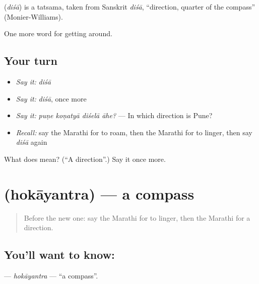 \begin{cousinweb}
\textbf{} (\emph{diśā}) is a tatsama, taken from Sanskrit \emph{diśā}, \textquotedblleft{}direction, quarter of the compass\textquotedblright{} (Monier-Williams).
\end{cousinweb}

\begin{grammarlens}[title={What you've built}]
One more word for getting around.
\end{grammarlens}

\subsection*{Your turn}
\begin{itemize}
\raggedright
  \item \emph{Say it:} \emph{diśā}
  \item \emph{Say it:} \emph{diśā}, once more
  \item \emph{Say it:} \emph{puṇe koṇatyā diśelā āhe?} — In which direction is Pune?
  \item \emph{Recall:} say the Marathi for to roam, then the Marathi for to linger, then say \emph{diśā} again
\end{itemize}

\begin{tcolorbox}[breakable,colback=teal!4,colframe=teal!35!black,title={Before you move on}]
What does  mean? (\textquotedblleft{}A direction\textquotedblright{}.) Say it once more.
\end{tcolorbox}
\section[\texorpdfstring{\mr{होकायंत्र} (hokāyantra)}{होकायंत्र (hokāyantra)}]{ (hokāyantra) — a compass}

\label{lesson:MR-C412-hokayantra}



\begin{quote}
Before the new one: say the Marathi for to linger, then the Marathi for a direction.
\end{quote}

\subsection*{You'll want to know: }
\textbf{} — \emph{hokāyantra} — \textquotedblleft{}a compass\textquotedblright{}.

